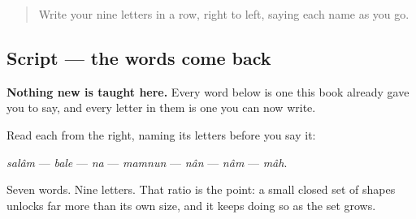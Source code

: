 \label{lesson:FA-C15-practice}



\begin{quote}
Write your nine letters in a row, right to left, saying each name as you go.
\end{quote}

\subsection*{Script — the words come back}
\textbf{Nothing new is taught here.} Every word below is one this book already gave you to say, and every letter in them is one you can now write.

Read each from the right, naming its letters before you say it:

\begin{quote}
\end{quote}

\begin{quote}
\end{quote}

\begin{quote}
\end{quote}

\begin{quote}
\end{quote}

\begin{quote}
\end{quote}

\begin{quote}
\end{quote}

\begin{quote}
\end{quote}

\emph{salâm} — \emph{bale} — \emph{na} — \emph{mamnun} — \emph{nân} — \emph{nâm} — \emph{mâh}.

Seven words. Nine letters. That ratio is the point: a small closed set of shapes unlocks far more than its own size, and it keeps doing so as the set grows.

